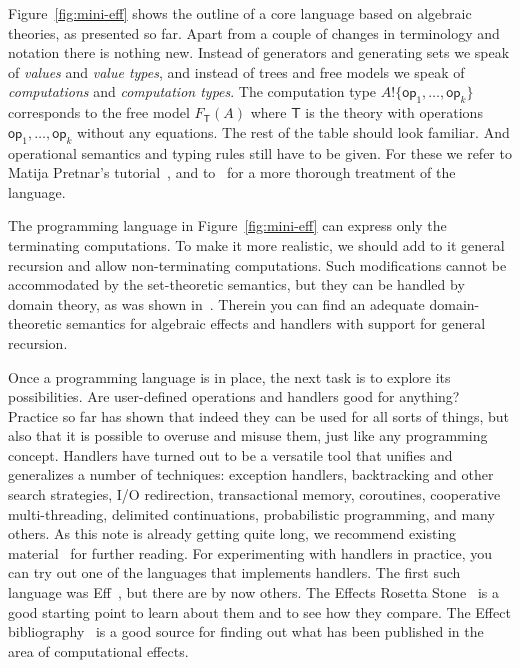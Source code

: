 \documentclass{amsart}
\newcommand{\theory}[1]{\mathsf{#1}} %
\newcommand{\Free}[2]{F_{\theory{#1}}(#2)} %
\newcommand{\op}[1]{\mathsf{op}_{#1}} %
\newcommand{\dirt}[2]{#1 \mathbin{!} #2} %
\begin{document}
Figure~\ref{fig:mini-eff} shows the outline of a core language based on
algebraic theories, as presented so far. Apart from a couple of changes in
terminology and notation there is nothing new. Instead of generators and
generating sets we speak of \emph{values} and \emph{value types}, and instead of
trees and free models we speak of \emph{computations} and \emph{computation
  types}. The computation type $\dirt{A}{\{\op{1}, \ldots, \op{k}\}}$
corresponds to the free model $\Free{T}{A}$ where $\theory{T}$ is the theory
with operations $\op{1}, \ldots, \op{k}$ without any equations. The rest of the
table should look familiar. And operational semantics and typing rules still
have to be given. For these we refer to Matija Pretnar's
tutorial~\cite{pretnar15:_introd_algeb_effec_handl}, and
to~\cite{bauer14:_effec_system_algeb_effec_handl,pretnar14:_infer_algeb_effec}
for a more thorough treatment of the language.

The programming language in Figure~\ref{fig:mini-eff} can express only the
terminating computations. To make it more realistic, we should add to it general
recursion and allow non-terminating computations. Such modifications cannot be
accommodated by the set-theoretic semantics, but they can be handled by domain
theory, as was shown in~\cite{bauer14:_effec_system_algeb_effec_handl}. Therein
you can find an adequate domain-theoretic semantics for algebraic effects and
handlers with support for general recursion.

Once a programming language is in place, the next task is to explore its
possibilities. Are user-defined operations and handlers good for anything?
Practice so far has shown that indeed they can be used for all sorts of things,
but also that it is possible to overuse and misuse them, just like any
programming concept. Handlers have turned out to be a versatile tool that
unifies and generalizes a number of techniques: exception handlers, backtracking
and other search strategies, I/O redirection, transactional memory, coroutines,
cooperative multi-threading, delimited continuations, probabilistic programming,
and many others. As this note is already getting quite long, we recommend
existing
material~\cite{pretnar15:_introd_algeb_effec_handl,bauer15:_progr,kammar13:_handl}
for further reading. For experimenting with handlers in practice, you can try
out one of the languages that implements handlers. The first such language was
Eff~\cite{bauer:_eff}, but there are by now others. The Effects Rosetta
Stone~\cite{effec_roset_stone} is a good starting point to learn about them and
to see how they compare. The Effect bibliography~\cite{effec} is a good source
for finding out what has been published in the area of computational effects.
\end{document}
